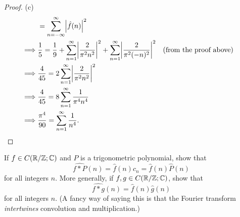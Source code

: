 \begin{proof}{(c)}
\begin{align*}
             & = \sum_{n = -\infty}^\infty \abs{\hat{f}(n)}^2                                                                                                                          \\
    \implies & \dfrac{1}{5} = \dfrac{1}{9} + \sum_{n = 1}^\infty \abs{\dfrac{2}{\pi^2 n^2}}^2 + \sum_{n = 1}^\infty \abs{\dfrac{2}{\pi^2 (-n)^2}}^2 &  & \text{(from the proof above)} \\
    \implies & \dfrac{4}{45} = 2 \sum_{n = 1}^\infty \abs{\dfrac{2}{\pi^2 n^2}}^2                                                                                                      \\
    \implies & \dfrac{4}{45} = 8 \sum_{n = 1}^\infty \dfrac{1}{\pi^4 n^4}                                                                                                              \\
    \implies & \dfrac{\pi^4}{90} = \sum_{n = 1}^\infty \dfrac{1}{n^4}.
  \end{align*}
\end{proof}

\begin{ex}\label{ex:5.5.3}
  If \(f \in C(\mathbb{R} / \mathbb{Z} ; \mathbb{C})\) and \(P\) is a trigonometric polynomial, show that
  \[
    \widehat{f * P}(n) = \hat{f}(n) c_n = \hat{f}(n) \hat{P}(n)
  \]
  for all integers \(n\).
  More generally, if \(f, g \in C(\mathbb{R} / \mathbb{Z} ; \mathbb{C})\), show that
  \[
    \widehat{f * g}(n) = \hat{f}(n) \hat{g}(n)
  \]
  for all integers \(n\).
  (A fancy way of saying this is that the Fourier transform \emph{intertwines} convolution and multiplication.)
\end{ex}

